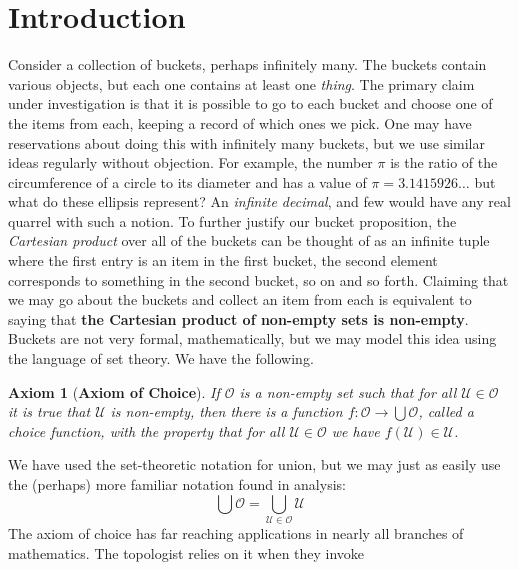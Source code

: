 \documentclass{article}
\newtheorem{axiom}{Axiom}[section]
\theoremstyle{definition}
\begin{document}
    \section{Introduction}
        Consider a collection of buckets, perhaps infinitely many. The buckets
        contain various objects, but each one contains at least one
        \textit{thing}. The primary claim under investigation is that it is
        possible to go to each bucket and choose one of the items from
        each, keeping a record of which ones we pick. One may have reservations
        about doing this with infinitely many buckets, but we use similar ideas
        regularly without objection. For example, the number $\pi$ is the
        ratio of the circumference of a circle to its diameter and has a
        value of $\pi=3.1415926\dots$ but what do these ellipsis represent?
        An \textit{infinite decimal}, and few would have any real quarrel
        with such a notion. To further justify our bucket proposition,
        the \textit{Cartesian product} over all of the buckets can be thought
        of as an infinite tuple where the first entry is an item in the
        first bucket, the second element corresponds to something in the
        second bucket, so on and so forth. Claiming that we may go about the
        buckets and collect an item from each is equivalent to saying that
        \textbf{the Cartesian product of non-empty sets is non-empty}. Buckets
        are not very formal, mathematically, but we may model this idea using
        the language of set theory. We have the following.
        \begin{axiom}[\textbf{Axiom of Choice}]
            If $\mathcal{O}$ is a non-empty set such that for all
            $\mathcal{U}\in\mathcal{O}$ it is true that $\mathcal{U}$ is
            non-empty, then there is a function
            $f:\mathcal{O}\rightarrow\bigcup\mathcal{O}$, called a
            \textit{choice function}, with the property that for all
            $\mathcal{U}\in\mathcal{O}$ we have $f(\mathcal{U})\in\mathcal{U}$.
        \end{axiom}
        We have used the set-theoretic notation for union, but we may just as
        easily use the (perhaps) more familiar notation found in analysis:
        \begin{equation}
            \bigcup\mathcal{O}
            =\bigcup_{\mathcal{U}\in\mathcal{O}}\mathcal{U}
        \end{equation}
        The axiom of choice has far reaching applications in nearly all
        branches of mathematics. The topologist relies on it when they invoke
\end{document}
